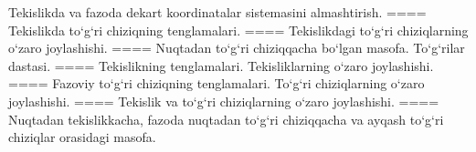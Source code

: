 Tekislikda va fazoda dekart koordinatalar sistemasini almashtirish.
====
Tekislikda to‘g‘ri chiziqning tenglamalari.
====
Tekislikdagi to‘g‘ri chiziqlarning o‘zaro joylashishi.
====
Nuqtadan to‘g‘ri chiziqqacha bo‘lgan masofa. To‘g‘rilar dastasi.
====
Tekislikning tenglamalari. Tekisliklarning o‘zaro joylashishi.
====
Fazoviy to‘g‘ri chiziqning tenglamalari. To‘g‘ri chiziqlarning o‘zaro joylashishi.
====
Tekislik va to‘g‘ri chiziqlarning o‘zaro joylashishi.
====
Nuqtadan tekislikkacha, fazoda nuqtadan to‘g‘ri chiziqqacha va ayqash to‘g‘ri chiziqlar orasidagi masofa.